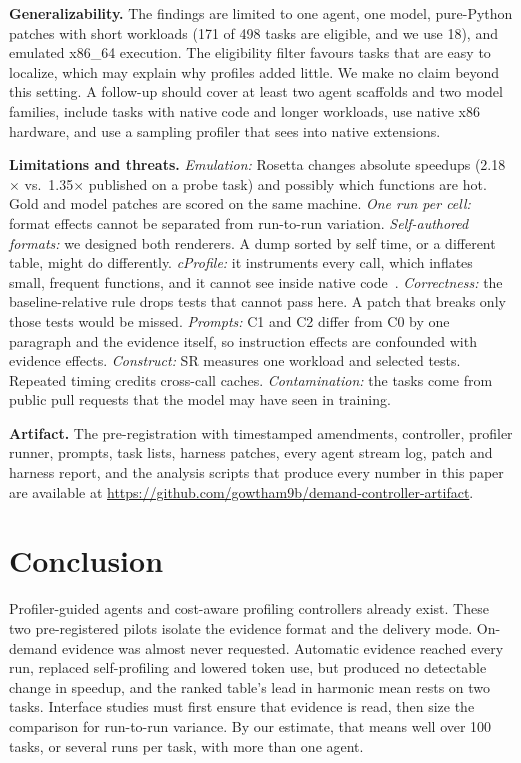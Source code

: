 \documentclass[conference]{IEEEtran}
\begin{document}
\textbf{Generalizability.} The findings are limited to one agent, one model,
pure-Python patches with short workloads (171 of 498 tasks are eligible, and
we use 18), and emulated x86\_64 execution. The eligibility filter favours
tasks that are easy to localize, which may explain why profiles added
little. We make no claim beyond this setting. A follow-up should cover at
least two agent scaffolds and two model families, include tasks with native
code and longer workloads, use native x86 hardware, and use a sampling
profiler that sees into native extensions.

\textbf{Limitations and threats.}
\emph{Emulation:} Rosetta changes absolute speedups (2.18$\times$ vs.\
1.35$\times$ published on a probe task) and possibly which functions are hot.
Gold and model patches are scored on the same machine.
\emph{One run per cell:} format effects cannot be separated from run-to-run
variation.
\emph{Self-authored formats:} we designed both renderers. A dump sorted by
self time, or a different table, might do differently.
\emph{cProfile:} it instruments every call, which inflates small, frequent
functions, and it cannot see inside native code~\cite{mytkowicz2010evaluating}.
\emph{Correctness:} the baseline-relative rule drops tests that cannot pass
here. A patch that breaks only those tests would be missed.
\emph{Prompts:} C1 and C2 differ from C0 by one paragraph and the evidence
itself, so instruction effects are confounded with evidence effects.
\emph{Construct:} SR measures one workload and selected tests. Repeated
timing credits cross-call caches.
\emph{Contamination:} the tasks come from public pull requests that the model
may have seen in training.

\textbf{Artifact.}\label{sec:artifact} The pre-registration with
timestamped amendments, controller, profiler runner, prompts, task lists,
harness patches, every agent stream log, patch and harness report, and the
analysis scripts that produce every number in this paper are available at
\url{https://github.com/gowtham9b/demand-controller-artifact}.

\section{Conclusion}

Profiler-guided agents and cost-aware profiling controllers already exist.
These two pre-registered pilots isolate the evidence format and the delivery
mode. On-demand evidence was almost never requested. Automatic evidence
reached every run, replaced self-profiling and lowered token use, but
produced no detectable change in speedup, and the ranked table's lead in
harmonic mean rests on two tasks. Interface studies must first ensure that
evidence is read, then size the comparison for run-to-run variance. By our
estimate, that means well over 100 tasks, or several runs per task, with
more than one agent.
\end{document}
